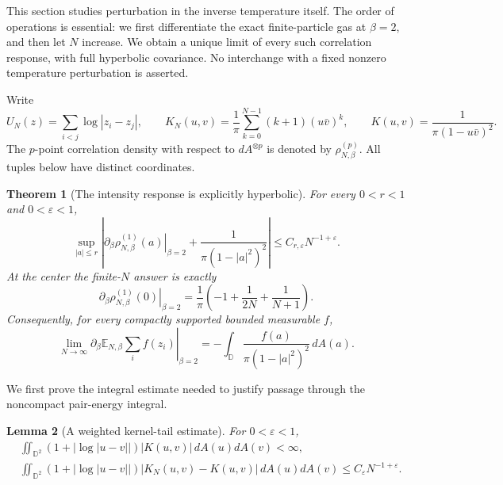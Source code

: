 \documentclass[11pt,a4paper]{article}
\numberwithin{equation}{section}
\newtheorem{theorem}{Theorem}[section]
\newtheorem{lemma}[theorem]{Lemma}
\theoremstyle{definition}
\theoremstyle{remark}
\newcommand{\D}{\mathbb D}
\newcommand{\E}{\mathbb E}
\begin{document}
This section studies perturbation in the inverse temperature itself.
The order of operations is essential: we first differentiate the exact
finite-particle gas at $\beta=2$, and then let $N$ increase.  We obtain
a unique limit of every such correlation response, with full hyperbolic
covariance.  No interchange with a fixed nonzero temperature perturbation
is asserted.

Write
\[
 U_N(z)=\sum_{i<j}\log|z_i-z_j|,
 \qquad K_N(u,v)=\frac1\pi\sum_{k=0}^{N-1}(k+1)(u\bar v)^k,
 \qquad K(u,v)=\frac1{\pi(1-u\bar v)^2}.
\]
The $p$-point correlation density with respect to $dA^{\otimes p}$ is
denoted by $\rho_{N,\beta}^{(p)}$.  All tuples below have distinct
coordinates.

\begin{theorem}[The intensity response is explicitly hyperbolic]
\label{thm:beta2-intensity-response}
For every $0<r<1$ and $0<\varepsilon<1$,
\begin{equation}
 \sup_{|a|\le r}\left|
 \left.\partial_\beta\rho_{N,\beta}^{(1)}(a)\right|_{\beta=2}
 +\frac1{\pi(1-|a|^2)^2}\right|
 \le C_{r,\varepsilon}N^{-1+\varepsilon}.
 \label{eq:beta2-intensity-response}
\end{equation}
At the center the finite-$N$ answer is exactly
\begin{equation}
 \left.\partial_\beta\rho_{N,\beta}^{(1)}(0)\right|_{\beta=2}
 =\frac1\pi\left(-1+\frac1{2N}+\frac1{N+1}\right).
 \label{eq:beta2-center-response}
\end{equation}
Consequently, for every compactly supported bounded measurable $f$,
\[
 \lim_{N\to\infty}
 \left.\partial_\beta\E_{N,\beta}\sum_i f(z_i)\right|_{\beta=2}
 =-\int_\D\frac{f(a)}{\pi(1-|a|^2)^2}\,dA(a).
\]
\end{theorem}

We first prove the integral estimate needed to justify passage through
the noncompact pair-energy integral.

\begin{lemma}[A weighted kernel-tail estimate]
\label{lem:beta2-weighted-kernel-tail}
For $0<\varepsilon<1$,
\begin{align}
 &\iint_{\D^2}(1+|\log|u-v||)|K(u,v)|\,dA(u)dA(v)<\infty,
 \label{eq:beta2-kernel-integrable}\\
 &\iint_{\D^2}(1+|\log|u-v||)|K_N(u,v)-K(u,v)|\,dA(u)dA(v)
 \le C_\varepsilon N^{-1+\varepsilon}.
 \label{eq:beta2-kernel-tail}
\end{align}
\end{lemma}
\end{document}
